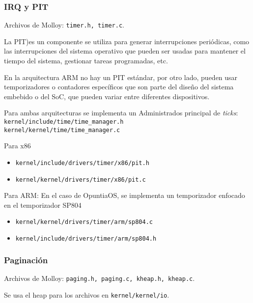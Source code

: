 	
		
	
	
	\subsubsection{IRQ y PIT}
		Archivos de Molloy: \texttt{timer.h, timer.c}.
		
		La PIT)es un componente se utiliza para generar interrupciones periódicas, como las interrupciones del sistema operativo que pueden ser usadas para mantener el tiempo del sistema, gestionar tareas programadas, etc.
		
		En la arquitectura ARM no hay un PIT estándar, por otro lado, pueden usar temporizadores o contadores específicos que son parte del diseño del sistema embebido o del SoC, que pueden variar entre diferentes dispositivos.
		
		Para ambas arquitecturas se implementa un Administrados principal de \textit{ticks}:\\
		\texttt{kernel/include/time/time\_manager.h} \\
		\texttt{kernel/kernel/time/time\_manager.c}
		
		Para x86
		\begin{itemize} \setlength\itemsep{0pt}
			\item \texttt{kernel/include/drivers/timer/x86/pit.h}
			\item \texttt{kernel/kernel/drivers/timer/x86/pit.c}
			
		\end{itemize}
	
		Para ARM:
		En el caso de OpuntiaOS, se implementa un temporizador enfocado en el temporizador SP804
		\begin{itemize} \setlength\itemsep{0pt}
			\item \texttt{kernel/kernel/drivers/timer/arm/sp804.c}
			\item \texttt{kernel/include/drivers/timer/arm/sp804.h}
		\end{itemize}
		
	
		

	
	\subsubsection{Paginación}
		Archivos de Molloy: \texttt{paging.h, paging.c, kheap.h, kheap.c}.
		
		
		Se usa el heap para los archivos en \texttt{kernel/kernel/io}.
		
